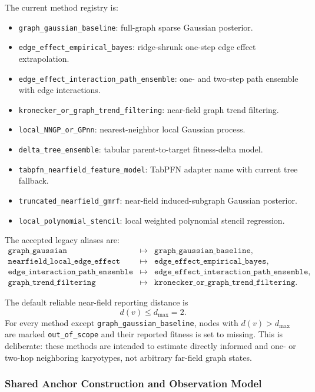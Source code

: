 \documentclass[11pt]{article}
\begin{document}
The current method registry is:
\begin{itemize}
  \item \texttt{graph\_gaussian\_baseline}: full-graph sparse Gaussian posterior.
  \item \texttt{edge\_effect\_empirical\_bayes}: ridge-shrunk one-step edge effect extrapolation.
  \item \texttt{edge\_effect\_interaction\_path\_ensemble}: one- and two-step path ensemble with edge interactions.
  \item \texttt{kronecker\_or\_graph\_trend\_filtering}: near-field graph trend filtering.
  \item \texttt{local\_NNGP\_or\_GPnn}: nearest-neighbor local Gaussian process.
  \item \texttt{delta\_tree\_ensemble}: tabular parent-to-target fitness-delta model.
  \item \texttt{tabpfn\_nearfield\_feature\_model}: TabPFN adapter name with current tree fallback.
  \item \texttt{truncated\_nearfield\_gmrf}: near-field induced-subgraph Gaussian posterior.
  \item \texttt{local\_polynomial\_stencil}: local weighted polynomial stencil regression.
\end{itemize}
The accepted legacy aliases are:
\[
\begin{array}{lll}
\texttt{graph\_gaussian} &\mapsto& \texttt{graph\_gaussian\_baseline},\\
\texttt{nearfield\_local\_edge\_effect} &\mapsto& \texttt{edge\_effect\_empirical\_bayes},\\
\texttt{edge\_interaction\_path\_ensemble} &\mapsto& \texttt{edge\_effect\_interaction\_path\_ensemble},\\
\texttt{graph\_trend\_filtering} &\mapsto& \texttt{kronecker\_or\_graph\_trend\_filtering}.
\end{array}
\]

The default reliable near-field reporting distance is
\[
  d(v)\le d_{\max}=2.
\]
For every method except \texttt{graph\_gaussian\_baseline}, nodes with
$d(v)>d_{\max}$ are marked \texttt{out\_of\_scope} and their reported fitness
is set to missing. This is deliberate: these methods are intended to estimate
directly informed and one- or two-hop neighboring karyotypes, not arbitrary
far-field graph states.

\subsubsection{Shared Anchor Construction and Observation Model}
\label{sec:s-anchors}
\end{document}
